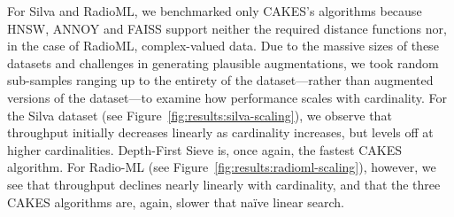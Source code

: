 For Silva and RadioML, we benchmarked only CAKES's algorithms because HNSW, ANNOY and FAISS support neither the required distance functions nor, in the case of RadioML, complex-valued data.
Due to the massive sizes of these datasets and challenges in generating plausible augmentations, we took random sub-samples ranging up to the entirety of the dataset---rather than augmented versions of the dataset---to examine how performance scales with cardinality.
For the Silva dataset (see Figure~\ref{fig:results:silva-scaling}), we observe that throughput initially decreases linearly as cardinality increases, but levels off at higher cardinalities.
Depth-First Sieve is, once again, the fastest CAKES algorithm.
For Radio-ML (see Figure~\ref{fig:results:radioml-scaling}), however, we see that throughput declines nearly linearly with cardinality, and that the three CAKES algorithms are, again, slower that na\"{i}ve linear search.


